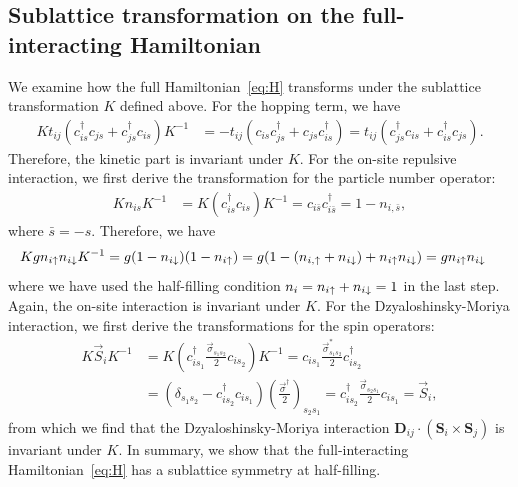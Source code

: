 \documentclass[11pt]{article}
\begin{document}
\subsection{Sublattice transformation on the full-interacting Hamiltonian}
We examine how the full Hamiltonian~\eqref{eq:H} transforms under the sublattice transformation $K$
defined above. For the hopping term, we have
\begin{align}
    K t_{ij}(c_{i s}^\dagger c_{j s} + c_{j s}^\dagger c_{i s}) K^{-1}
    &= -t_{ij}(c_{i s} c_{j s}^\dagger + c_{j s}c_{i s}^\dagger)
    = t_{ij}(c_{j s}^\dagger c_{i s} + c_{i s}^\dagger c_{j s}).
\end{align}
Therefore, the kinetic part is invariant under $K$.
For the on-site repulsive interaction, we first derive the transformation for
the particle number operator:
\begin{align}
    K n_{i s} K^{-1}&= K (c^\dagger_{is} c_{is}) K^{-1}
    = c_{i \bar{s}} c^{\dagger}_{i \bar{s}} = 1-n_{i,\bar{s}},
\end{align}
where $\bar{s} = -s$. Therefore, we have
\begin{align}
    K g n_{i \uparrow} n_{i \downarrow} K^{-1}&= g(1-n_{i \downarrow})(1-n_{i\uparrow})
    = g(1-(n_{i, \uparrow}+n_{i\downarrow}) + n_{i\uparrow} n_{i\downarrow}) = g n_{i\uparrow} n_{i\downarrow}
\end{align}
where we have used the half-filling condition $n_i = n_{i\uparrow} + n_{i\downarrow} = 1$
in the last step. Again, the on-site interaction is invariant under $K$.
For the Dzyaloshinsky-Moriya interaction, we first derive the transformations for the spin
operators:
\begin{align}
    K \vec{S}_i K^{-1}&= K (c^\dagger_{is_1} \frac{\vec{\sigma}_{s_1 s_2}}{2} c_{is_2}) K^{-1}
    =  c_{i s_1} \frac{\vec{\sigma}^*_{s_1 s_2}}{2} c^\dagger_{is_2} \nonumber\\
    &= (\delta_{s_1 s_2}-c^\dagger_{i s_2} c_{i s_1})
    (\frac{\vec{\sigma}^\dagger}{2})_{s_2 s_1}
    = c^\dagger_{i s_2} \frac{\vec{\sigma}_{s_2 s_1}}{2} c_{is_1} = \vec{S}_i,
\end{align}
from which we find that the Dzyaloshinsky-Moriya interaction $\bm D_{ij}\cdot(\bm S_i \times \bm S_j)$
is invariant under $K$.
In summary, we show that the full-interacting Hamiltonian~\eqref{eq:H} has a sublattice symmetry
at half-filling.
\end{document}
